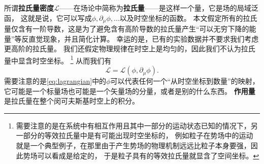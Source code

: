 \documentclass[hyperref, UTF8, a4paper]{ctexart}
\begin{document}
所谓\textbf{拉氏量密度}$\mathcal{L}$——在场论中简称为\textbf{拉氏量}——是这样一个量，它是场的局域泛函，
这就是说，它可以写成$\phi, \partial_\mu \phi, \ldots$以及时空坐标的函数。
本文假定所有的拉氏量仅含有一阶导数，这是为了避免含有高阶导数的拉氏量产生“可以无穷下降的能量”等反直觉现象，并且简化计算。
幸运的是，已有的实验数据并不要求我们考虑更高阶的拉氏量。
我们还假定物理规律在时空上是均匀的，因此我们不认为拉氏量中显含时空坐标。%
\footnote{
    需要注意的是在系统中有相互作用且其中一部分的运动状态已知的情况下，另一部分的等效拉氏量中是有可能出现时空坐标的，
    例如粒子在势场中的运动就是一个典型例子，在那里由于产生势场的物理机制远远比粒子本身要强，因此势场可以看成是给定的，
    于是粒子具有的等效拉氏量就显含了空间坐标。}%
从而我们有
\begin{equation}
    \mathcal{L} = \mathcal{L}(\phi, \partial_\mu \phi).
    \label{eq:lagrangian}
\end{equation}
需要注意的是\eqref{eq:lagrangian}中的$\phi$可以代表任何一个“从时空坐标到数量”的映射，
它可能是一个标量场也可能是一个矢量场的分量，或者是别的什么东西。
\textbf{作用量}是拉氏量在整个闵可夫斯基时空上的积分。
\end{document}
